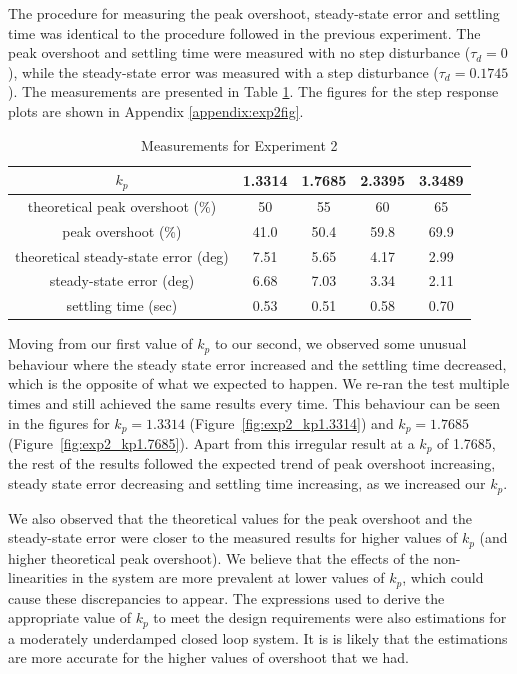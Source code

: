 \documentclass[12pt]{article}
\begin{document}
The procedure for measuring the peak overshoot, steady-state error and settling time was identical to the procedure followed in the previous experiment. The peak overshoot and settling time were measured with no step disturbance ($\tau_d = 0$), while the steady-state error was measured with a step disturbance ($\tau_d = 0.1745$). The measurements are presented in Table \ref{table:exp2_measurements}. The figures for the step response plots are shown in Appendix \ref{appendix:exp2fig}.

\begin{table}[h!]
\centering
\begin{tabular}{|c|c|c|c|c|} \hline
    $k_p$ & 1.3314 & 1.7685 & 2.3395 & 3.3489 \\ \hline
    theoretical peak overshoot (\%) & 50 & 55 & 60 & 65 \\ \hline
    peak overshoot (\%) & 41.0 & 50.4 & 59.8 & 69.9 \\ \hline
    theoretical steady-state error (deg) & 7.51 & 5.65 & 4.17 & 2.99 \\ \hline
    steady-state error (deg) & 6.68 & 7.03 & 3.34 & 2.11 \\ \hline
    settling time (sec) & 0.53 & 0.51 & 0.58 & 0.70 \\ \hline 
\end{tabular}
\caption{\label{table:exp2_measurements}Measurements for Experiment 2}
\end{table}

Moving from our first value of $k_p$ to our second, we observed some unusual behaviour where the steady state error increased and the settling time decreased, which is the opposite of what we expected to happen. We re-ran the test multiple times and still achieved the same results every time. This behaviour can be seen in the figures for $k_p = 1.3314$ (Figure~\ref{fig:exp2_kp1.3314}) and $k_p = 1.7685$ (Figure~\ref{fig:exp2_kp1.7685}). Apart from this irregular result at a $k_p$ of 1.7685, the rest of the results followed the expected trend of peak overshoot increasing, steady state error decreasing and settling time increasing, as we increased our $k_p$.

We also observed that the theoretical values for the peak overshoot and the steady-state error were closer to the measured results for higher values of $k_p$ (and higher theoretical peak overshoot). We believe that the effects of the non-linearities in the system are more prevalent at lower values of $k_p$, which could cause these discrepancies to appear. The expressions used to derive the appropriate value of $k_p$ to meet the design requirements were also estimations for a moderately underdamped closed loop system. It is is likely that the estimations are more accurate for the higher values of overshoot that we had.
\end{document}

